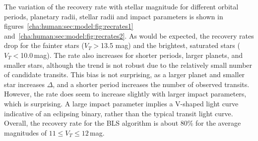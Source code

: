 The variation of the recovery rate with stellar magnitude for different orbital periods, planetary radii, stellar radii and impact parameters is shown in figures~\ref{cha:human:sec:model:fig:recrates1} and~\ref{cha:human:sec:model:fig:recrates2}.
As would be expected, the recovery rates drop for the fainter stars ($V_{T}>$13.5 mag) and the brightest, saturated stars ($V_{T}<$10.0\,mag). 
The rate also increases for shorter periods, larger planets, and smaller stars, although the trend is not robust due to the relatively small number of candidate transits.
This bias is not surprising, as a larger planet and smaller star increases $\Delta$, and a shorter period increases the number of observed transits. However, the rate does seem to increase slightly with larger impact parameters, which is surprising. A large impact parameter implies a V-shaped light curve indicative of an eclipsing binary, rather than the typical transit light curve. 
Overall, the recovery rate for the BLS algorithm is about 80\% for the average magnitudes of $11 \leq V_{T} \leq 12$\,mag.

